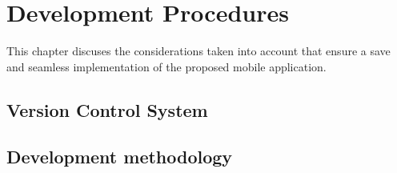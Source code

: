 \chapter{Development Procedures}
This chapter discuses the considerations taken into account that ensure a save and seamless implementation of the proposed mobile application.

\section{Version Control System}

\section{Development methodology}